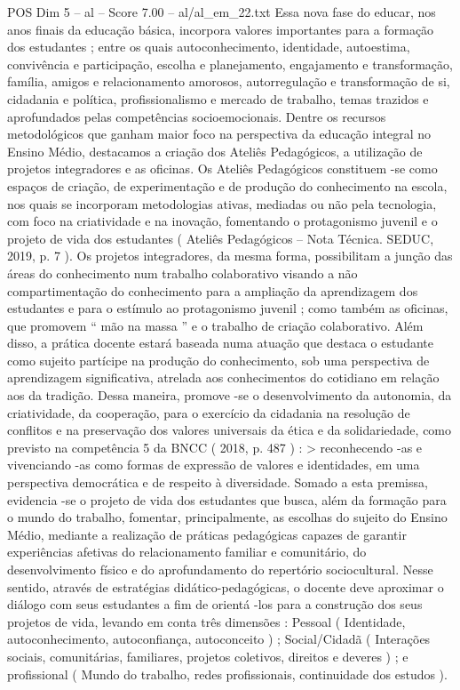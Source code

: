 \begin{textsample}{POS Dim 5 – al – Score 7.00 – al/al\_em\_22.txt}
Essa nova fase do educar, nos anos finais da educação básica, incorpora valores importantes para a formação dos estudantes ; entre os quais autoconhecimento, identidade, autoestima, convivência e participação, escolha e planejamento, engajamento e transformação, família, amigos e relacionamento amorosos, autorregulação e transformação de si, cidadania e política, profissionalismo e mercado de trabalho, temas trazidos e aprofundados pelas competências socioemocionais.
Dentre os recursos metodológicos que ganham maior foco na perspectiva da educação integral no Ensino Médio, destacamos a criação dos Ateliês Pedagógicos, a utilização de projetos integradores e as oficinas.
Os Ateliês Pedagógicos constituem -se como espaços de criação, de experimentação e de produção do conhecimento na escola, nos quais se incorporam metodologias ativas, mediadas ou não pela tecnologia, com foco na criatividade e na inovação, fomentando o protagonismo juvenil e o projeto de vida dos estudantes ( Ateliês Pedagógicos – Nota Técnica.
SEDUC, 2019, p. 7 ).
Os projetos integradores, da mesma forma, possibilitam a junção das áreas do conhecimento num trabalho colaborativo visando a não compartimentação do conhecimento para a ampliação da aprendizagem dos estudantes e para o estímulo ao protagonismo juvenil ; como também as oficinas, que promovem “ mão na massa ” e o trabalho de criação colaborativo.
Além disso, a prática docente estará baseada numa atuação que destaca o estudante como sujeito partícipe na produção do conhecimento, sob uma perspectiva de aprendizagem significativa, atrelada aos conhecimentos do cotidiano em relação aos da tradição.
Dessa maneira, promove -se o desenvolvimento da autonomia, da criatividade, da cooperação, para o exercício da cidadania na resolução de conflitos e na preservação dos valores universais da ética e da solidariedade, como previsto na competência 5 da BNCC ( 2018, p. 487 ) : > reconhecendo -as e vivenciando -as como formas de expressão de valores e identidades, em uma perspectiva democrática e de respeito à diversidade.
Somado a esta premissa, evidencia -se o projeto de vida dos estudantes que busca, além da formação para o mundo do trabalho, fomentar, principalmente, as escolhas do sujeito do Ensino Médio, mediante a realização de práticas pedagógicas capazes de garantir experiências afetivas do relacionamento familiar e comunitário, do desenvolvimento físico e do aprofundamento do repertório sociocultural.
Nesse sentido, através de estratégias didático-pedagógicas, o docente deve aproximar o diálogo com seus estudantes a fim de orientá -los para a construção dos seus projetos de vida, levando em conta três dimensões : Pessoal ( Identidade, autoconhecimento, autoconfiança, autoconceito ) ; Social/Cidadã ( Interações sociais, comunitárias, familiares, projetos coletivos, direitos e deveres ) ; e profissional ( Mundo do trabalho, redes profissionais, continuidade dos estudos ).

\end{textsample}
